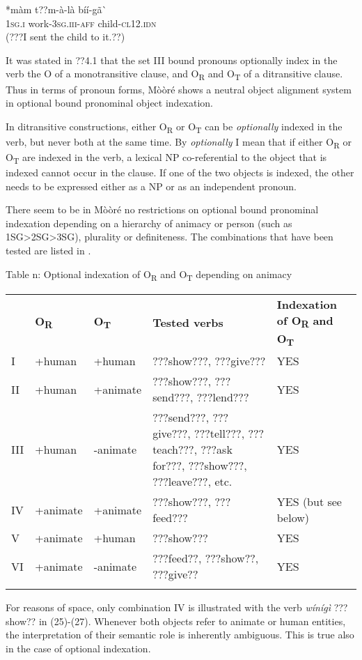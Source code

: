 \documentclass[output=paper]{langsci/langscibook}
\begin{document}
\ea \gll 
\label{bkm:Ref424201839}*màm  t??m-à-là      bíí-gã\`{ }
\\
%
\textsc{1sg.i  }  work-\textsc{3sg.iii-aff}    child-\textsc{cl12.idn}
\\\glt
(???I sent the child to it.??)
\z

It was stated in ??4.1 that the set III bound pronouns optionally index in the verb the O of a monotransitive clause, and O\textsubscript{R} and O\textsubscript{T }of a ditransitive clause. Thus in terms of pronoun forms, Mòòré shows a neutral object alignment system in optional bound pronominal object indexation.  

In ditransitive constructions, either O\textsubscript{R} or O\textsubscript{T} can be \textit{optionally} indexed in the verb, but never both at the same time. By \textit{optionally} I mean that if either O\textsubscript{R} or O\textsubscript{T} are indexed in the verb, a lexical NP co-referential to the object that is indexed cannot occur in the clause. If one of the two objects is indexed, the other needs to be expressed either as a NP or as an independent pronoun. 

There seem to be in Mòòré no restrictions on optional bound pronominal indexation depending on a hierarchy of animacy or person (such as 1SG{\textgreater}2SG{\textgreater}3SG), plurality or definiteness. The combinations that have been tested are listed in .

\begin{styleTabellenberschrift}
\label{bkm:Ref444780805}Table n: Optional indexation of O\textsubscript{R} and O\textsubscript{T} depending on animacy
\end{styleTabellenberschrift}

\begin{tabular}{lllll} & \textbf{O}\textbf{\textsubscript{R}} & \textbf{O}\textbf{\textsubscript{T}} & \textbf{Tested verbs} & \textbf{Indexation of O}\textbf{\textsubscript{R}}\textbf{ and O}\textbf{\textsubscript{T}}\textbf{ }\\
\lsptoprule
I & +human & +human & ???show???, ???give??? & YES\\
II & +human & +animate & ???show???, ???send???, ???lend??? & YES\\
III & +human & {}-animate & ???send???, ???give???, ???tell???, ???teach???, ???ask for???, ???show???, ???leave???, etc. & YES\\
IV & +animate & +animate & ???show???, ???feed??? & YES (but see below)\\
V & +animate & +human & ???show??? & YES\\
VI & +animate & {}-animate & ???feed??, ???show??, ???give?? & YES\\
\lspbottomrule
\end{tabular}
For reasons of space, only combination IV is illustrated with the verb \textit{wínígì} ???show?? in (25){}-(27). Whenever both objects refer to animate or human entities, the interpretation of their semantic role is inherently ambiguous. This is true also in the case of optional indexation.
\end{document}
